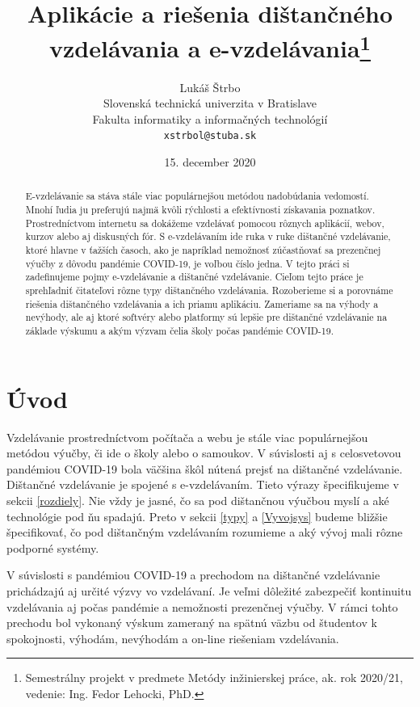 \documentclass[10pt,oneside,slovak,a4paper]{article}
\title{Aplikácie a riešenia dištančného vzdelávania a e-vzdelávania\thanks{Semestrálny projekt v predmete Metódy inžinierskej práce, ak. rok 2020/21, vedenie: Ing. Fedor Lehocki, PhD.}}
\author{Lukáš Štrbo\\[2pt]
	{\small Slovenská technická univerzita v Bratislave}\\
	{\small Fakulta informatiky a informačných technológií}\\
	{\small \texttt{xstrbol@stuba.sk}}
	}
\date{\small 15. december 2020}
\begin{document}
\maketitle

\begin{abstract}
E-vzdelávanie sa stáva stále viac populárnejšou metódou nadobúdania vedomostí. Mnohí ľudia ju preferujú najmä kvôli rýchlosti a efektívnosti získavania poznatkov.
Prostredníctvom internetu sa dokážeme vzdelávať pomocou rôznych aplikácií, webov, kurzov alebo aj diskusných fór.
S e-vzdelávaním ide ruka v ruke dištančné vzdelávanie, ktoré hlavne v ťažších časoch, ako je napríklad nemožnosť zúčastňovať sa prezenčnej výučby z dôvodu pandémie COVID-19, 
 je voľbou číslo jedna. V tejto práci si zadefinujeme pojmy e-vzdelávanie a dištančné vzdelávanie. Cieľom tejto práce je sprehľadniť čitateľovi rôzne typy dištančného vzdelávania. Rozoberieme si a porovnáme riešenia dištančného vzdelávania a ich priamu
 aplikáciu. Zameriame sa na výhody a nevýhody, ale aj ktoré softvéry alebo platformy sú lepšie pre dištančné vzdelávanie na základe výskumu a akým výzvam čelia školy počas pandémie COVID-19.
\end{abstract}


\section*{Úvod} %
\label{uvod}
Vzdelávanie prostredníctvom počítača a webu je stále viac populárnejšou metódou výučby, či ide o školy alebo o samoukov. V súvislosti aj s celosvetovou pandémiou 
COVID-19 bola väčšina škôl nútená prejsť na dištančné vzdelávanie. Dištančné vzdelávanie je spojené s e-vzdelávaním. Tieto výrazy špecifikujeme v sekcii \ref{rozdiely}.  
Nie vždy je jasné, čo sa pod dištančnou výučbou myslí a aké technológie pod ňu spadajú. Preto v sekcii \ref{typy} a \ref{Vyvojsys} budeme bližšie špecifikovať, čo
pod dištančným vzdelávaním rozumieme a aký vývoj mali rôzne podporné systémy.
 
V súvislosti s pandémiou COVID-19 a prechodom na dištančné vzdelávanie prichádzajú aj určité výzvy vo vzdelávaní.
Je veľmi dôležité zabezpečiť kontinuitu vzdelávania aj počas pandémie a nemožnosti prezenčnej výučby.
V rámci tohto prechodu bol vykonaný výskum zameraný na spätnú väzbu od študentov k spokojnosti, výhodám, nevýhodám a on-line riešeniam vzdelávania.
\end{document}
